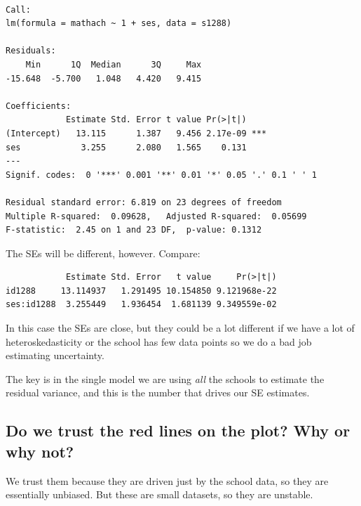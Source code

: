 \documentclass[
  letterpaper,
  DIV=11,
  numbers=noendperiod]{scrreprt}
\newenvironment{Shaded}{\begin{snugshade}}{\end{snugshade}}
\newcommand{\DecValTok}[1]{\textcolor[rgb]{0.25,0.63,0.44}{#1}}
\newcommand{\FunctionTok}[1]{\textcolor[rgb]{0.02,0.16,0.49}{#1}}
\newcommand{\NormalTok}[1]{\textcolor[rgb]{0.00,0.44,0.13}{#1}}
\newcommand{\OtherTok}[1]{\textcolor[rgb]{0.00,0.44,0.13}{#1}}
\newcommand{\SpecialCharTok}[1]{\textcolor[rgb]{0.25,0.44,0.63}{#1}}
\begin{document}
\begin{verbatim}

Call:
lm(formula = mathach ~ 1 + ses, data = s1288)

Residuals:
    Min      1Q  Median      3Q     Max 
-15.648  -5.700   1.048   4.420   9.415 

Coefficients:
            Estimate Std. Error t value Pr(>|t|)    
(Intercept)   13.115      1.387   9.456 2.17e-09 ***
ses            3.255      2.080   1.565    0.131    
---
Signif. codes:  0 '***' 0.001 '**' 0.01 '*' 0.05 '.' 0.1 ' ' 1

Residual standard error: 6.819 on 23 degrees of freedom
Multiple R-squared:  0.09628,   Adjusted R-squared:  0.05699 
F-statistic:  2.45 on 1 and 23 DF,  p-value: 0.1312
\end{verbatim}

The SEs will be different, however. Compare:

\begin{Shaded}
\end{Shaded}

\begin{verbatim}
            Estimate Std. Error   t value     Pr(>|t|)
id1288     13.114937   1.291495 10.154850 9.121968e-22
ses:id1288  3.255449   1.936454  1.681139 9.349559e-02
\end{verbatim}

In this case the SEs are close, but they could be a lot different if we
have a lot of heteroskedasticity or the school has few data points so we
do a bad job estimating uncertainty.

The key is in the single model we are using \emph{all} the schools to
estimate the residual variance, and this is the number that drives our
SE estimates.

\hypertarget{do-we-trust-the-red-lines-on-the-plot-why-or-why-not}{%
\subsection{Do we trust the red lines on the plot? Why or why
not?}\label{do-we-trust-the-red-lines-on-the-plot-why-or-why-not}}

We trust them because they are driven just by the school data, so they
are essentially unbiased. But these are small datasets, so they are
unstable.
\end{document}
